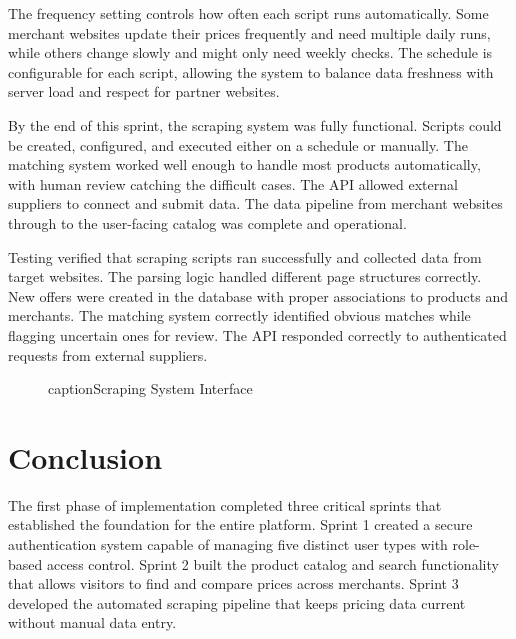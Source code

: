 The frequency setting controls how often each script runs
automatically. Some merchant websites update their prices
frequently and need multiple daily runs, while others change
slowly and might only need weekly checks. The schedule is
configurable for each script, allowing the system to balance
data freshness with server load and respect for partner websites.

By the end of this sprint, the scraping system was fully
functional. Scripts could be created, configured, and executed
either on a schedule or manually. The matching system worked
well enough to handle most products automatically, with human
review catching the difficult cases. The API allowed external
suppliers to connect and submit data. The data pipeline from
merchant websites through to the user-facing catalog was
complete and operational.

Testing verified that scraping scripts ran successfully and
collected data from target websites. The parsing logic handled
different page structures correctly. New offers were created
in the database with proper associations to products and merchants.
The matching system correctly identified obvious matches while
flagging uncertain ones for review. The API responded correctly
to authenticated requests from external suppliers.

\begin{figure}[H]
\begin{center}
\end{center}
caption{Scraping System Interface}
\label{fig:scraping_interface}
\end{figure}

\section*{Conclusion}

The first phase of implementation completed three critical
sprints that established the foundation for the entire platform.
Sprint 1 created a secure authentication system capable of
managing five distinct user types with role-based access control.
Sprint 2 built the product catalog and search functionality
that allows visitors to find and compare prices across merchants.
Sprint 3 developed the automated scraping pipeline that keeps
pricing data current without manual data entry.

